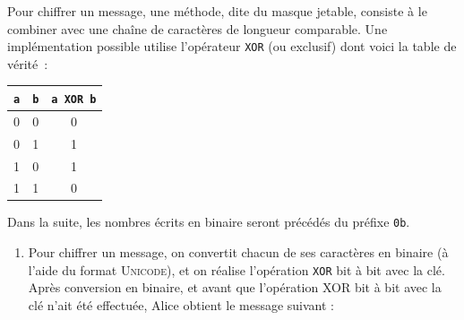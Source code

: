 \documentclass[a4paper,12pt,french]{book}
\begin{document}
\begin{exercice}
     Pour chiffrer un message, une méthode, dite du masque jetable, consiste à le combiner avec une chaîne de caractères de longueur comparable.
     Une implémentation possible utilise l’opérateur \texttt{XOR} (ou exclusif) dont voici la table de vérité :
    \begin{center}
    	\begin{tabular}{|c|c|c|}
                \hline
                \rowcolor{UGLiOrange} \textbf{\color{white}\texttt{a} }& \textbf{\color{white}\texttt{b}} & \textbf{\color{white}\texttt{a XOR b} }  \\
                \hline
                0 & 0 & 0 \\
                \hline
                0 & 1 & 1 \\
                \hline
                1 & 0 & 1 \\
                \hline
                1 & 1 & 0 \\
                \hline
                \end{tabular}
                \end{center}
   	Dans la suite, les nombres écrits en binaire seront précédés du préfixe \texttt{0b}.
       \begin{enumerate}[\bfseries 1.]
       	\item Pour chiffrer un message, on convertit chacun de ses caractères en binaire (à l’aide du format \textsc{Unicode}), et on réalise l’opération \texttt{XOR} bit à bit avec la clé.\\

                Après conversion en binaire, et avant que l’opération XOR bit à bit avec la clé n’ait été effectuée, Alice obtient le message suivant :


\end{enumerate}
\end{exercice}
\end{document}

